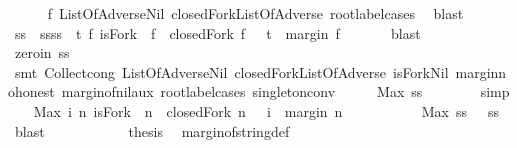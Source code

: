 \begin{isabellebody}
\ \ \ \ \isamarkupfalse%
\ f{}\ ListOfAdverse{\isachardot}Nil\ closedFork{\isacharunderscore}ListOfAdverse\ root{\isacharunderscore}label{\isacharunderscore}{}{\isachardot}cases\ \isamarkupfalse%
\ blast\ \ \ \isanewline
\ \ \ \isamarkupfalse%
\ ss\ \ ss{\isacharcolon}{\isachardoublequoteopen}ss\ {\isacharequal}\ {\isacharbraceleft}t{\isachardot}\ {\isasymexists}f{\isachardot}\ isFork\ {\isacharbrackleft}{\isacharbrackright}\ f\ {\isasymand}\ closedFork\ f\ {\isacharbrackleft}{\isacharbrackright}\ {\isasymand}\ t\ {\isacharequal}\ margin\ f\ {\isacharbrackleft}{\isacharbrackright}{\isacharbraceright}{\isachardoublequoteclose}\isanewline
\ \ \ \ \isamarkupfalse%
\ blast\ \isanewline
\ \ \isamarkupfalse%
\ \isamarkupfalse%
\ zero{\isacharunderscore}in{\isacharcolon}\ {\isachardoublequoteopen}ss\ {\isacharequal}\ {\isacharbraceleft}{}{\isacharbraceright}{\isachardoublequoteclose}\isanewline
\ \ \ \ \isamarkupfalse%
\ {\isacharparenleft}smt\ Collect{\isacharunderscore}cong\ ListOfAdverse{\isachardot}Nil\ closedFork{\isacharunderscore}ListOfAdverse\ isFork{\isacharunderscore}Nil\ margin{\isacharunderscore}no{\isacharunderscore}honest\ margin{\isacharunderscore}of{\isacharunderscore}nil{\isacharunderscore}aux\ root{\isacharunderscore}label{\isacharunderscore}{}{\isachardot}cases\ singleton{\isacharunderscore}conv{\isacharparenright}\isanewline
\ \ \isamarkupfalse%
\ \isamarkupfalse%
\ {\isachardoublequoteopen}Max\ ss\ {\isacharequal}\ {}{\isachardoublequoteclose}\isanewline
\ \ \ \ \isamarkupfalse%
\ simp\isanewline
\ \ \isamarkupfalse%
\ {\isachardoublequoteopen}Max\ {\isacharbraceleft}i{\isachardot}\ {\isasymexists}n{\isachardot}\ isFork\ {\isacharbrackleft}{\isacharbrackright}\ n\ {\isasymand}\ closedFork\ n\ {\isacharbrackleft}{\isacharbrackright}\ {\isasymand}\ i\ {\isacharequal}\ margin\ n\ {\isacharbrackleft}{\isacharbrackright}{\isacharbraceright}\ {\isacharequal}\ {}{\isachardoublequoteclose}\isanewline
\ \ \ \ \ \ \isamarkupfalse%
\ {\isacartoucheopen}Max\ ss\ {\isacharequal}\ {}{\isacartoucheclose}\ ss\ \isamarkupfalse%
\ blast\ \ \ \ \ \ \isanewline
\ \ \isamarkupfalse%
\ \isamarkupfalse%
\ {\isacharquery}thesis\ \isamarkupfalse%
\ margin{\isacharunderscore}of{\isacharunderscore}string{\isacharunderscore}def\isanewline

\end{isabellebody}
